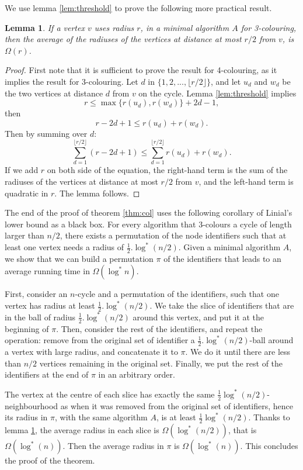 \documentclass{sig-alternate-2013}
\newtheorem{lemma}[theorem]{Lemma}
\begin{document}
We use lemma \ref{lem:threshold} to prove the following more practical result.  
 
\begin{lemma}\label{lem:neighbourhood}
If a vertex $v$ uses radius $r$, in a minimal algorithm $A$ for 3-colouring, then the average of the radiuses of the vertices at distance at most $r/2$ from $v$, is $\Omega(r)$.
\end{lemma} 

\begin{proof} First note that it is sufficient to prove the result for 4-colouring, as it implies the result for 3-colouring. 
Let $d$ in $\{1,2,..., \lfloor{} r/2 \rfloor{} \}$, and let $u_d$ and $w_d$ be the two vertices at distance $d$ from $v$ on the cycle. 
Lemma \ref{lem:threshold} implies 
$$r \leq \max\{r(u_d),r(w_d)\} + 2d -1,$$
then 
$$r- 2d +1 \leq r(u_d)+ r(w_d).$$ 
Then by summing over $d$:
$$ \sum_{d=1}^{\lfloor{} r/2 \rfloor{}} (r -2d +1) 
\leq  \sum_{d=1}^{\lfloor r/2 \rfloor{}} r(u_d) +r(w_d).$$
If we add $r$ on both side of the equation, the right-hand term is the sum of the radiuses of the vertices at distance at most $r/2$ from $v$, and the left-hand term is quadratic in $r$. The lemma follows. 
\end{proof}

The end of the proof of theorem \ref{thm:col} uses the following corollary of Linial's lower bound as a black box. For every algorithm that 3-colours a cycle of length larger than $n/2$, there exists a permutation of the node identifiers such that at least one vertex needs a radius of $\frac{1}{2}.\log^*(n/2)$. Given a minimal algorithm $A$, we show that we can build a permutation $\pi$ of the identifiers that leads to an average running time in $\Omega(\log^*n)$. 

First, consider an $n$-cycle and a permutation of the identifiers, such that one vertex has radius at least $\frac{1}{2}.\log^*(n/2)$. We take the slice of identifiers that are in the ball of radius $\frac{1}{2}.\log^*(n/2)$ around this vertex, and put it at the beginning of $\pi$. Then, consider the rest of the identifiers, and repeat the operation: remove from the original set of identifier a $\frac{1}{2}.\log^*(n/2)$-ball around a vertex with large radius, and concatenate it to $\pi$. We do it until there are less than $n/2$ vertices remaining in the original set. Finally, we put the rest of the identifiers at the end of $\pi$ in an arbitrary order. 

The vertex at the centre of each slice has exactly the same $\frac{1}{2}\log^*(n/2)$-neighbourhood as when it was removed from the original set of identifiers, hence its radius in $\pi$, with the same algorithm $A$, is at least $\frac{1}{2}\log^*(n/2)$. Thanks to lemma \ref{lem:neighbourhood}, the average radius in each slice is $\Omega(\log^*(n/2))$, that is $\Omega(\log^*(n))$. Then the average radius in $\pi$ is $\Omega(\log^*(n))$. This concludes the proof of the theorem.
\end{document}
